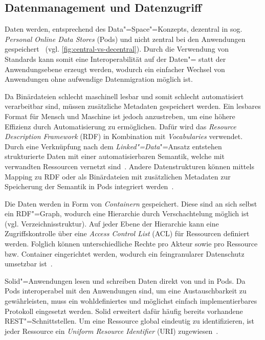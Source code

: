 \subsection{Datenmanagement und Datenzugriff}

Daten werden, entsprechend des Data"=Space"=Konzepts, dezentral in sog. \emph{Personal Online Data Stores} (Pods) und nicht zentral bei den Anwendungen gespeichert~\cite{mecklerWebLinkedData2023} (vgl. \autoref{fig:central-vs-decentral}).
Durch die Verwendung von Standards kann somit eine Interoperabilität auf der Daten"= statt der Anwendungsebene erzeugt werden, wodurch ein einfacher Wechsel von Anwendungen ohne aufwendige Datenmigration möglich ist.

Da Binärdateien schlecht maschinell lesbar und somit schlecht automatisiert verarbeitbar sind, müssen zusätzliche Metadaten gespeichert werden.
Ein lesbares Format für Mensch und Maschine ist jedoch anzustreben, um eine höhere Effizienz durch Automatisierung zu ermöglichen.
Dafür wird das \emph{Resource Description Framework} (RDF) in Kombination mit \emph{Vocabularies} verwendet.
Durch eine Verknüpfung nach dem \emph{Linked"=Data}"=Ansatz entstehen strukturierte Daten mit einer automatisierbaren Semantik, welche mit verwandten Ressourcen vernetzt sind~\cite{bizerLinkedDataStory2009,mecklerWebLinkedData2023,sambraSolidPlatformDecentralized2016}.
Andere Datenstrukturen können mittels Mapping zu RDF oder als Binärdateien mit zusätzlichen Metadaten zur Speicherung der Semantik in Pods integriert werden~\cite{mecklerWebLinkedData2023,sambraSolidPlatformDecentralized2016}.

Die Daten werden in Form von \emph{Containern} gespeichert.
Diese sind an sich selbst ein RDF"=Graph, wodurch eine Hierarchie durch Verschachtelung möglich ist (vgl. Verzeichnisstruktur).
Auf jeder Ebene der Hierarchie kann eine Zugriffskontrolle über eine \emph{Access Control List} (ACL) für Ressourcen definiert werden.
Folglich können unterschiedliche Rechte pro Akteur sowie pro Ressource bzw. Container eingerichtet werden, wodurch ein feingranularer Datenschutz umsetzbar ist~\cite{mecklerWebLinkedData2023,sambraSolidPlatformDecentralized2016}.

Solid"=Anwendungen lesen und schreiben Daten direkt von und in Pods.
Da Pods interoperabel mit den Anwendungen sind, um eine Austauschbarkeit zu gewährleisten, muss ein wohldefiniertes und möglichst einfach implementierbares Protokoll eingesetzt werden.
Solid erweitert dafür häufig bereits vorhandene REST"=Schnittstellen.
Um eine Ressource global eindeutig zu identifizieren, ist jeder Ressource ein \emph{Uniform Resource Identifier} (URI) zugewiesen~\cite{mecklerWebLinkedData2023,sambraSolidPlatformDecentralized2016}.

